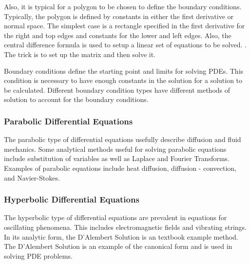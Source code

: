 Also, it is typical for a polygon to be chosen to define the boundary conditions.   Typically, the polygon is defined by constants in either the first derivative or normal space.  %
The simplest case is a rectangle specified in the first derivative for the right and top edges and constants for the lower and left edges.  Also, the central difference formula is used to setup a linear set of equations to be solved.  \cite{appliedmethods}.  The trick is to set up the matrix and then solve it. %


Boundary conditions define the starting point and limits for solving PDEs.  This condition is necessary to have enough constants in the solution for a solution to be calculated.  Different boundary condition types have different methods of solution to account for the boundary conditions.  

\subsubsection {Parabolic Differential Equations}
The parabolic type of differential equations usefully describe diffusion and fluid mechanics.  Some analytical methods useful for solving parabolic equations include substitution of variables as well as Laplace and Fourier Transforms.  Examples of parabolic equations include heat diffusion, diffusion - convection, and Navier-Stokes.  


\subsubsection {Hyperbolic Differential Equations}
The hyperbolic type of differential equations are prevalent in equations for oscillating phenomena.  This includes electromagnetic fields and vibrating strings.   In its analytic %
form, the D'Alembert Solution is an textbook example method.  The D'Alembert Solution is an example of the canonical form and is used in solving PDE problems.  

